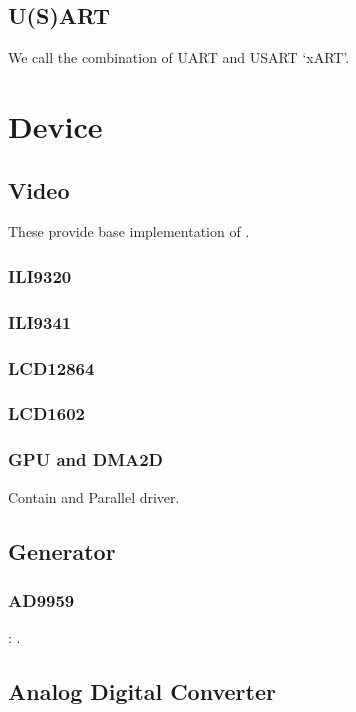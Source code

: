 \subsection{U(S)ART}

We call the combination of UART and USART `xART'. 

\section{Device}

\subsection{Video}

These provide base implementation of .

\subsubsection{ILI9320}
\subsubsection{ILI9341}
\subsubsection{LCD12864}
\subsubsection{LCD1602}


\subsubsection{GPU and DMA2D}

Contain  and {Parallel} driver.

\subsection{Generator}

\subsubsection{AD9959}

: .

\subsection{Analog Digital Converter}

